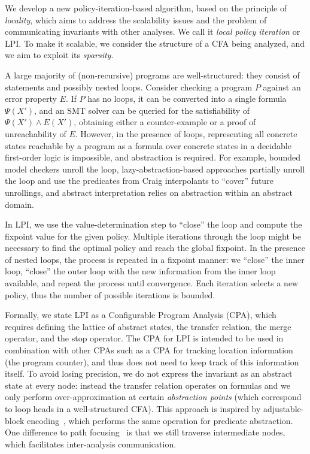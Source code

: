 \documentclass{llncs}
\newcommand{\cfa}{\textsc{CFA}\xspace}
\begin{document}
We develop a new policy-iteration-based algorithm, based on the principle of
\emph{locality},
which aims to address the scalability issues and the problem of communicating
invariants with other analyses.
We call it \emph{local policy iteration} or \textsc{LPI}.
To make it scalable, we consider the structure of a \cfa being analyzed, and we
aim to exploit its \emph{sparsity}.

A large majority of (non-recursive) programs are well-structured:
they consist of statements and possibly nested loops.
Consider checking a program $P$ against an error property $E$.  If $P$ has no
loops, it can be converted into a single formula~$\Psi(X')$, and an SMT solver can be
queried for the satisfiability of $\Psi(X') \land E(X')$, obtaining either
a counter-example or a proof of unreachability of $E$.
However, in the presence of loops, representing all concrete states reachable by
a program as a
formula over concrete states in a decidable first-order logic
is impossible, and abstraction is required.
For example, bounded model checkers unroll the loop, lazy-abstraction-based
approaches partially unroll the loop and use the predicates from Craig interpolants to ``cover'' future unrollings, and
abstract interpretation relies on abstraction within an abstract domain.

In LPI, we use the value-determination step to
``close'' the loop and compute the fixpoint value for the given policy.
Multiple iterations through the loop might be necessary to find the optimal
policy and reach the global fixpoint.
In the presence of nested loops, the process is repeated in a fixpoint manner:
we ``close'' the inner loop, ``close'' the outer loop with the new information
from the inner loop available, and repeat the process until convergence.
Each iteration selects a new policy,
thus the number of possible iterations is bounded.

Formally, we state LPI as a Configurable Program Analysis (\textsc{CPA}),
which requires defining the lattice of abstract
states, the transfer relation, the merge operator, and the stop operator.
The \textsc{CPA} for LPI is intended to be used in combination with other CPAs
such as a \textsc{CPA} for tracking location information (the program counter),
and thus does not need to keep track of this information itself.
To avoid losing precision, we do not express the invariant
as an abstract state at every node: instead the transfer
relation operates on formulas and we only perform over-approximation at certain
\emph{abstraction points} (which correspond to loop heads in a well-structured
\textsc{\cfa}).
This approach is inspired by adjustable-block
encoding~\cite{adjustable_block_encoding}, which performs the same operation for
predicate abstraction.
One difference to path focusing~\cite{path_focusing} is that we still traverse
intermediate nodes, which facilitates inter-analysis communication.
\end{document}
